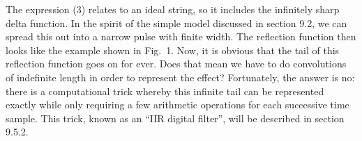   The expression (3) relates to an ideal string, so it includes the infinitely 
  sharp delta function. In the spirit of the simple model discussed in section 
  9.2, we can spread this out into a narrow pulse with finite width. The 
  reflection function then looks like the example shown in Fig.\ 1. Now, it is 
  obvious that the tail of this reflection function goes on for ever. Does that 
  mean we have to do convolutions of indefinite length in order to represent 
  the effect? Fortunately, the answer is no: there is a computational trick 
  whereby this infinite tail can be represented exactly while only requiring a 
  few arithmetic operations for each successive time sample. This trick, known 
  as an ``IIR digital filter'', will be described in section 9.5.2. 

